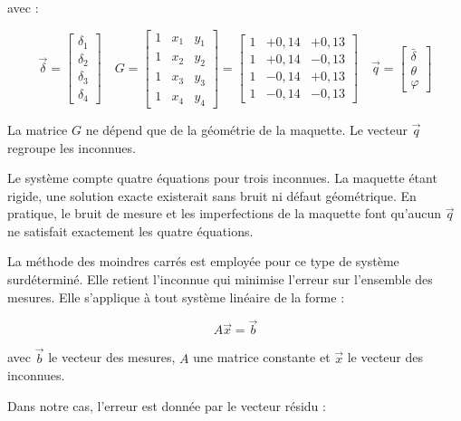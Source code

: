 avec :

\begin{equation}
    \vec{\delta}=\begin{bmatrix}
        \delta_1 \\ \delta_2 \\ \delta_3 \\ \delta_4
    \end{bmatrix} \quad G = \begin{bmatrix}
        1 & x_1 & y_1 \\
        1 & x_2 & y_2 \\
        1 & x_3 & y_3 \\
        1 & x_4 & y_4
    \end{bmatrix} = \begin{bmatrix}
        1 & +0{,}14 & +0{,}13 \\
        1 & +0{,}14 & -0{,}13 \\
        1 & -0{,}14 & +0{,}13 \\
        1 & -0{,}14 & -0{,}13
    \end{bmatrix}\quad
    \vec{q} = \begin{bmatrix}
        \bar\delta \\ \theta \\ \varphi
    \end{bmatrix}
\end{equation}

La matrice $G$ ne dépend que de la géométrie de la maquette. Le vecteur $\vec{q}$ regroupe les inconnues.

Le système compte quatre équations pour trois inconnues. La maquette étant rigide, une solution exacte existerait sans bruit ni défaut géométrique. En pratique, le bruit de mesure et les imperfections de la maquette font qu'aucun $\vec{q}$ ne satisfait exactement les quatre équations.

La méthode des moindres carrés \cite{MoindreCarre} est employée pour ce type de système surdéterminé. Elle retient l'inconnue qui minimise l'erreur sur l'ensemble des mesures. Elle s'applique à tout système linéaire de la forme :

\begin{equation}
    A\vec{x} = \vec{b}
\end{equation}

avec $\vec{b}$ le vecteur des mesures, $A$ une matrice constante et $\vec{x}$ le vecteur des inconnues.

Dans notre cas, l'erreur est donnée par le vecteur résidu :

